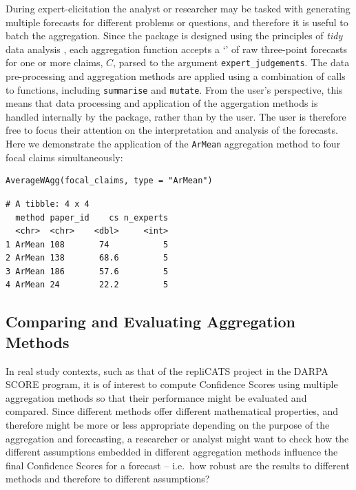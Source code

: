 \documentclass[article]{jss}
\newcommand{\class}[1]{`\code{#1}'}
\begin{document}
During expert-elicitation the analyst or researcher may be tasked with
generating multiple forecasts for different problems or questions, and
therefore it is useful to batch the aggregation. Since the
 package is designed using the principles of \emph{tidy}
data analysis \citep{tidyverse2019}, each aggregation function accepts a
\class{data.frame} of raw three-point forecasts for one or more claims,
\(C\), parsed to the argument \texttt{expert\_judgements}. The data
pre-processing and aggregation methods are applied using a combination
of calls to  functions, including \texttt{summarise} and
\texttt{mutate}. From the user's perspective, this means that data
processing and application of the aggergation methods is handled
internally by the  package, rather than by the user. The
user is therefore free to focus their attention on the interpretation
and analysis of the forecasts. Here we demonstrate the application of
the \texttt{ArMean} aggregation method to four focal claims
simultaneously:

\begin{verbatim}
AverageWAgg(focal_claims, type = "ArMean")
\end{verbatim}

\begin{verbatim}
# A tibble: 4 x 4
  method paper_id    cs n_experts
  <chr>  <chr>    <dbl>     <int>
1 ArMean 108       74           5
2 ArMean 138       68.6         5
3 ArMean 186       57.6         5
4 ArMean 24        22.2         5
\end{verbatim}

\subsection{Comparing and Evaluating Aggregation
Methods}\label{comparing-and-evaluating-aggregation-methods}

In real study contexts, such as that of the repliCATS project in the
DARPA SCORE program, it is of interest to compute Confidence Scores
using multiple aggregation methods so that their performance might be
evaluated and compared. Since different methods offer different
mathematical properties, and therefore might be more or less appropriate
depending on the purpose of the aggregation and forecasting, a
researcher or analyst might want to check how the different assumptions
embedded in different aggregation methods influence the final Confidence
Scores for a forecast -- i.e.~how robust are the results to different
methods and therefore to different assumptions?
\end{document}
